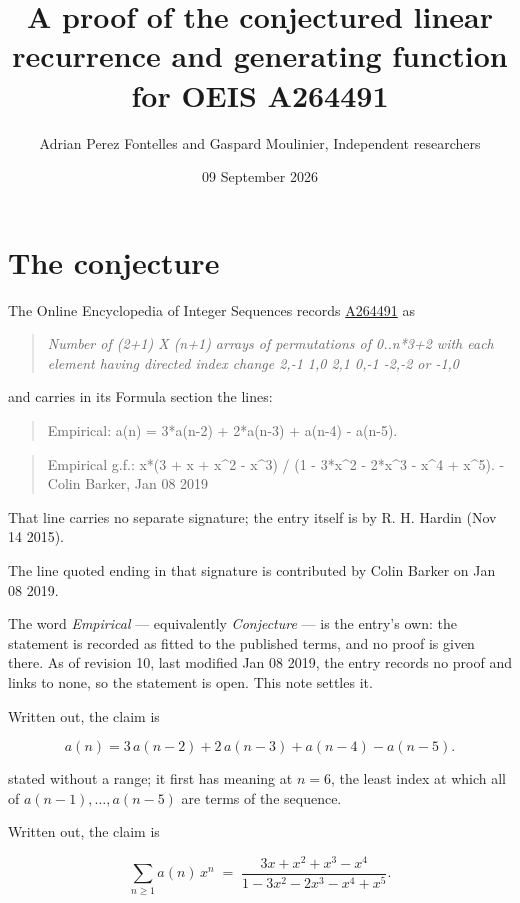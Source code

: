 \documentclass[11pt]{article}
\title{A proof of the conjectured linear recurrence and generating function for OEIS A264491}
\author{Adrian Perez Fontelles and Gaspard Moulinier, Independent researchers}
\date{09 September 2026}
\theoremstyle{definition}
\begin{document}
\maketitle
\section{The conjecture}

The Online Encyclopedia of Integer Sequences records \href{https://oeis.org/A264491}{A264491} as

\begin{quote}\itshape Number of (2+1) X (n+1) arrays of permutations of 0..n*3+2 with each element having directed index change 2,-1 1,0 2,1 0,-1 -2,-2 or -1,0\end{quote}

and carries in its Formula section the lines:

\begin{quote}\ttfamily Empirical: a(n) = 3*a(n-2) + 2*a(n-3) + a(n-4) - a(n-5).\end{quote}

\begin{quote}\ttfamily Empirical g.f.: x*(3 + x + x\textasciicircum{}2 - x\textasciicircum{}3) / (1 - 3*x\textasciicircum{}2 - 2*x\textasciicircum{}3 - x\textasciicircum{}4 + x\textasciicircum{}5). - Colin Barker, Jan 08 2019\end{quote}

That line carries no separate signature; the entry itself is by R. H. Hardin (Nov 14 2015).

The line quoted ending in that signature is contributed by Colin Barker on Jan 08 2019.

The word {\itshape Empirical} --- equivalently {\itshape Conjecture} --- is the entry's own: the statement is recorded as fitted to the published terms, and no proof is given there. As of revision 10, last modified Jan 08 2019, the entry records no proof and links to none, so the statement is open. This note settles it.

Written out, the claim is

\[a(n) = 3\,a(n-2) + 2\,a(n-3) + a(n-4) - a(n-5).\]

stated without a range; it first has meaning at $n = 6$, the least index at which all of $a(n-1),\dots,a(n-5)$ are terms of the sequence.

Written out, the claim is

\[\sum_{n \ge 1} a(n)\,x^n \;=\; \frac{3x + x^{2} + x^{3} - x^{4}}{1 - 3x^{2} - 2x^{3} - x^{4} + x^{5}}.\]
\end{document}
